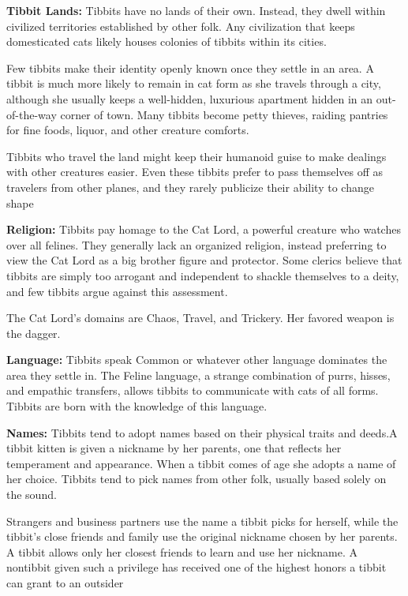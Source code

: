 \textbf{Tibbit Lands:} Tibbits have no lands of their own. Instead, they dwell within civilized territories established by other folk. Any civilization that keeps
domesticated cats likely houses colonies of tibbits within its cities. 

Few tibbits make their identity openly known once they settle in an area. A tibbit is much more likely to remain in cat form as she travels through a city, although she usually keeps a well-hidden, luxurious apartment hidden in an out-of-the-way corner of town. Many tibbits become petty thieves, raiding pantries for
fine foods, liquor, and other creature comforts.

Tibbits who travel the land might keep their humanoid guise to make dealings with other creatures easier. Even these tibbits prefer to pass themselves off as travelers from other planes, and they rarely publicize their ability to change shape

\textbf{Religion:} Tibbits pay homage to the Cat Lord, a powerful creature who watches over all felines. They generally lack an organized religion, instead preferring to view the Cat Lord as a big brother figure and protector. Some clerics believe that tibbits are simply too arrogant and independent to shackle themselves to a deity, and few tibbits argue against this assessment.

The Cat Lord's domains are Chaos, Travel, and Trickery. Her favored weapon is the dagger. 

\textbf{Language:} Tibbits speak Common or whatever other language dominates the area they settle in. The Feline language, a strange combination of purrs, hisses, and
empathic transfers, allows tibbits to communicate with cats of all forms. Tibbits are born with the knowledge of this language.

\textbf{Names:} Tibbits tend to adopt names based on their physical traits and deeds.A tibbit kitten is given a nickname by her parents, one that reflects her temperament and appearance. When a tibbit comes of age she adopts a name of her choice. Tibbits tend to pick names from other folk, usually based solely on the sound.

Strangers and business partners use the name a tibbit picks for herself, while the tibbit's close friends and family use the original nickname chosen by her parents.
A tibbit allows only her closest friends to learn and use her nickname. A nontibbit given such a privilege has received one of the highest honors a tibbit can grant to an outsider

